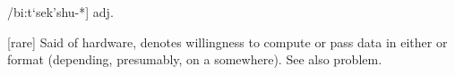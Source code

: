  /bi:t`sek'shu-*] adj.

[rare] Said of hardware, denotes willingness to compute or pass data in either
 or  format (depending,
presumably, on a  somewhere). See also 
problem.

